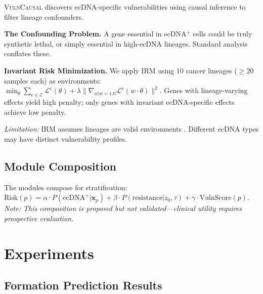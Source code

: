 \documentclass{article}
\newcommand{\vulncausal}{\textsc{VulnCausal}}
\begin{document}
\vulncausal{} discovers ecDNA-specific vulnerabilities using causal inference to filter lineage confounders.

\textbf{The Confounding Problem.} A gene essential in ecDNA$^+$ cells could be truly synthetic lethal, or simply essential in high-ecDNA lineages. Standard analysis conflates these.

\textbf{Invariant Risk Minimization.} We apply IRM \citep{arjovsky_2019_irm} using 10 cancer lineages ($\geq$20 samples each) as environments:
$\min_\theta \sum_{e \in \mathcal{E}} \mathcal{L}^e(\theta) + \lambda \|\nabla_{w|w=1.0} \mathcal{L}^e(w \cdot \theta)\|^2$.
Genes with lineage-varying effects yield high penalty; only genes with invariant ecDNA-specific effects achieve low penalty.

\textit{Limitation:} IRM assumes lineages are valid environments \citep{rosenfeld_2021_irm_risks}. Different ecDNA types may have distinct vulnerability profiles.

\subsection{Module Composition}
\label{sec:integration}

The modules compose for stratification: $\text{Risk}(p) = \alpha \cdot P(\text{ecDNA}^+ | \mathbf{x}_p) + \beta \cdot P(\text{resistance} | z_0, \tau) + \gamma \cdot \text{VulnScore}(p)$. \textit{Note: This composition is proposed but not validated---clinical utility requires prospective evaluation.}


\section{Experiments}
\label{sec:experiments}

\subsection{Formation Prediction Results}
\end{document}
